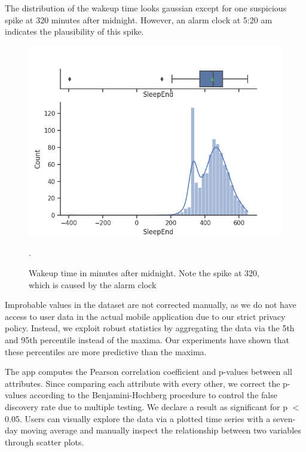 \documentclass[conference]{IEEEtran}
\begin{document}
The distribution of the wakeup time looks gaussian except for one suspicious spike at 320 minutes after midnight. However, an alarm clock at 5:20 am indicates the plausibility of this spike.
\begin{figure}[htbp]
\begin{center}
\includegraphics[width=1\linewidth]{figs/SleepEnd.png}
\caption{Wakeup time in minutes after midnight. Note the spike at 320, which is caused by the alarm clock}.
\label{fig:alarm}
\end{center}
\end{figure}

Improbable values in the dataset are not corrected manually, as we do not have access to user data in the actual mobile application due to our strict privacy policy.
Instead, we exploit robust statistics by aggregating the data via the 5th and 95th percentile instead of the maxima. Our experiments have shown that these percentiles are more predictive than the maxima.


The app computes the Pearson correlation coefficient and p-values between all attributes. Since comparing each attribute with every other, we correct the p-values according to the Benjamini-Hochberg procedure\cite{benjamini_controlling_1995} to control the false discovery rate due to multiple testing.
We declare a result as significant for p $<$ 0.05.
Users can visually explore the data via a plotted time series with a seven-day moving average and manually inspect the relationship between two variables through scatter plots.
\end{document}

